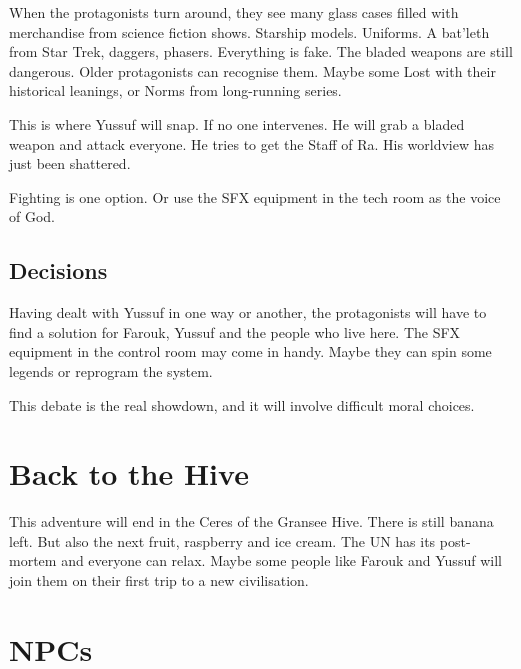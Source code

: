 When the protagonists turn around, they see many glass cases filled with merchandise from science fiction shows. Starship models. Uniforms. A bat'leth from Star Trek, daggers, phasers. Everything is fake. The bladed weapons are still dangerous. Older protagonists can recognise them. Maybe some Lost with their historical leanings, or Norms from long-running series.

This is where Yussuf will snap. If no one intervenes. He will grab a bladed weapon and attack everyone. He tries to get the Staff of Ra. His worldview has just been shattered.

Fighting is one option. Or use the SFX equipment in the tech room as the voice of God.

\subsection{Decisions}

Having dealt with Yussuf in one way or another, the protagonists will have to find a solution for Farouk, Yussuf and the people who live here. The SFX equipment in the control room may come in handy. Maybe they can spin some legends or reprogram the system.

This debate is the real showdown, and it will involve difficult moral choices.

\section{Back to the Hive}

This adventure will end in the Ceres of the Gransee Hive. There is still banana left. But also the next fruit, raspberry and ice cream. The UN has its post-mortem and everyone can relax. Maybe some people like Farouk and Yussuf will join them on their first trip to a new civilisation.

\section{NPCs}

\newpage

